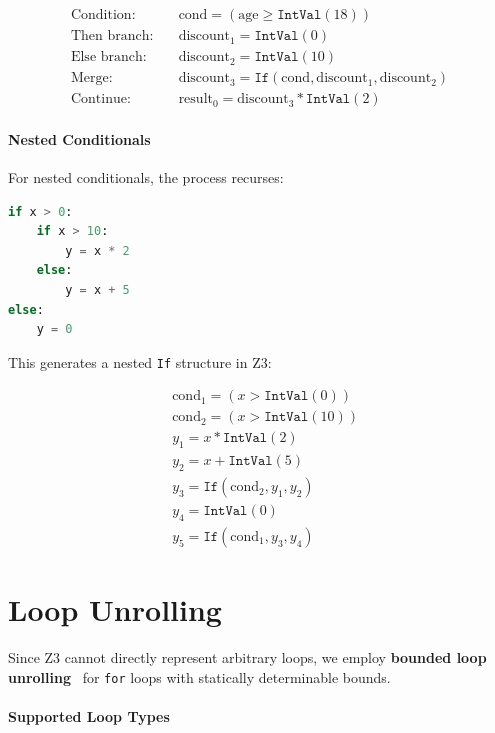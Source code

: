\begin{align*}
\text{Condition:} \quad & \text{cond} = (\text{age} \geq \texttt{IntVal}(18)) \\
\text{Then branch:} \quad & \text{discount}_1 = \texttt{IntVal}(0) \\
\text{Else branch:} \quad & \text{discount}_2 = \texttt{IntVal}(10) \\
\text{Merge:} \quad & \text{discount}_3 = \texttt{If}(\text{cond}, \text{discount}_1, \text{discount}_2) \\
\text{Continue:} \quad & \text{result}_0 = \text{discount}_3 * \texttt{IntVal}(2)
\end{align*}

\paragraph{Nested Conditionals}

For nested conditionals, the process recurses:

\begin{lstlisting}[language=Python, numbers=none, caption={Nested conditional example}]
if x > 0:
    if x > 10:
        y = x * 2
    else:
        y = x + 5
else:
    y = 0
\end{lstlisting}

This generates a nested \texttt{If} structure in Z3:

\begin{align*}
& \text{cond}_1 = (x > \texttt{IntVal}(0)) \\
& \text{cond}_2 = (x > \texttt{IntVal}(10)) \\
& y_1 = x * \texttt{IntVal}(2) \\
& y_2 = x + \texttt{IntVal}(5) \\
& y_3 = \texttt{If}(\text{cond}_2, y_1, y_2) \\
& y_4 = \texttt{IntVal}(0) \\
& y_5 = \texttt{If}(\text{cond}_1, y_3, y_4)
\end{align*}

\section{Loop Unrolling}

Since Z3 cannot directly represent arbitrary loops, we employ \textbf{bounded loop unrolling}~\cite{clarke2001bounded, kroening2014cbmc} for \texttt{for} loops with statically determinable bounds.

\paragraph{Supported Loop Types}

